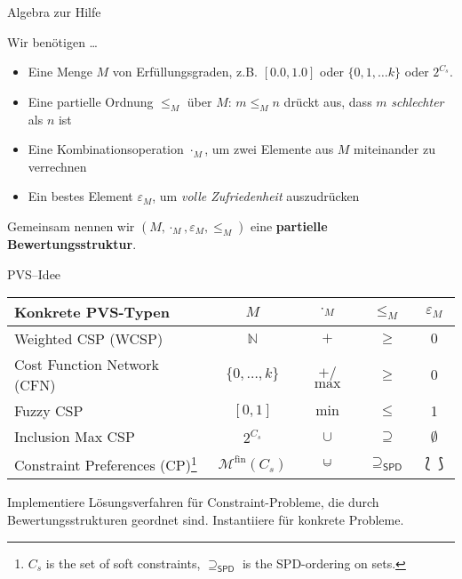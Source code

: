 \begin{frame}{Algebra zur Hilfe}

Wir benötigen \ldots 

\begin{itemize}
\item Eine Menge $M$ von Erfüllungsgraden, z.B. $[0.0, 1.0]$ oder $\{0, 1, \ldots k\}$ oder $2^{C_s}$. \pause 
\item Eine partielle Ordnung $\leq_M$ über $M$: $m \leq_M n$ drückt aus, dass $m$ \emph{schlechter} als $n$ ist \pause 
\item Eine Kombinationsoperation $\cdot_M$, um zwei Elemente aus $M$ miteinander zu verrechnen  \pause 
\item Ein bestes Element $\varepsilon_M$, um \emph{volle Zufriedenheit} auszudrücken \pause
\end{itemize}
  
  Gemeinsam nennen wir $(M, \cdot_M, \varepsilon_M, \leq_M)$ eine \textbf{partielle Bewertungsstruktur}.
  
  \hfill \emph{\cite{Gadducci2013,SchiendorferPvs2015}}
\end{frame}


%

\begin{frame}[fragile]{PVS--Idee}
\begin{center}
\begin{tabular}{l|c|c|c|c}
\textbf{Konkrete PVS-Typen} & $M$ & $\cdot_M$ & $\leq_M$ & $\varepsilon_M$ \\ 
\hline 
Weighted CSP (WCSP)& $\mathbb{N}$ & $+$ & $\geq$ & $0$ \\ 
Cost Function Network (CFN)& $\{0,\ldots,k\}$ & $+$/$\max$ & $\geq$ & $0$ \\ 
Fuzzy CSP & $[0,1]$ & $\min$ & $\leq$  & 1 \\ 
Inclusion Max CSP & $2^{C_s}$ & $\cup$ & $\supseteq$  & $\emptyset$ \\ 
Constraint Preferences (CP)\footnote{$C_s$ is the set of soft constraints, $\supseteq_{\mathsf{SPD}}$ is the SPD-ordering on sets.} &$\mathcal{M}^{\mathrm{fin}} (C_s)$ & $\mcup$ & $\supseteq_{\mathsf{SPD}}$ & $\lbag \rbag$ \\ 
\end{tabular} 
\end{center}

\begin{parchment}[Hauptidee]
Implementiere Lösungsverfahren für Constraint-Probleme, die durch Bewertungsstrukturen geordnet sind. Instantiiere für konkrete Probleme.
\end{parchment}
\end{frame}

